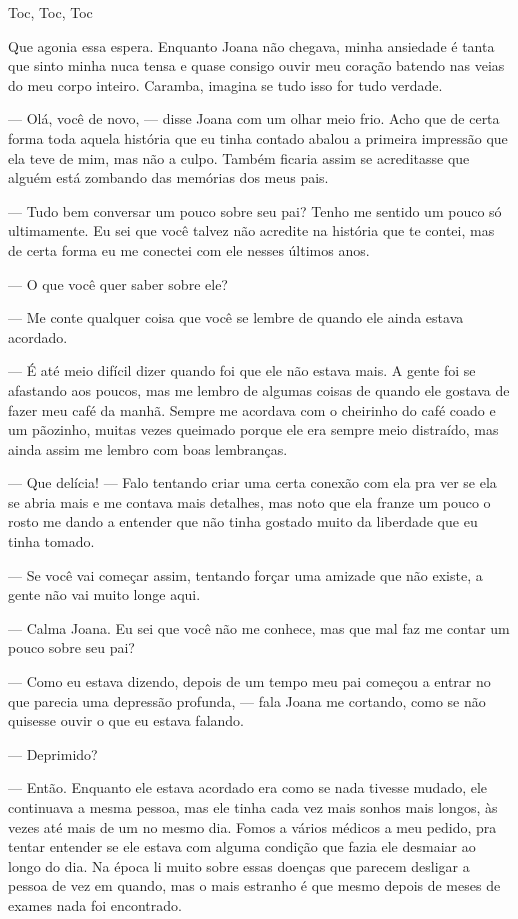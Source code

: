 Toc, Toc, Toc

Que agonia essa espera. Enquanto Joana não chegava, minha ansiedade é tanta que sinto minha nuca tensa e quase consigo ouvir meu coração batendo nas veias do meu corpo inteiro. Caramba, imagina se tudo isso for tudo verdade.

— Olá, você de novo, — disse Joana com um olhar meio frio. Acho que de certa forma toda aquela história que eu tinha contado abalou a primeira impressão que ela teve de mim, mas não a culpo. Também ficaria assim se acreditasse que alguém está zombando das memórias dos meus pais.

— Tudo bem conversar um pouco sobre seu pai? Tenho me sentido um pouco só ultimamente. Eu sei que você talvez não acredite na história que te contei, mas de certa forma eu me conectei com ele nesses últimos anos.

— O que você quer saber sobre ele?

— Me conte qualquer coisa que você se lembre de quando ele ainda estava acordado.

— É até meio difícil dizer quando foi que ele não estava mais. A gente foi se afastando aos poucos, mas me lembro de algumas coisas de quando ele gostava de fazer meu café da manhã. Sempre me acordava com o cheirinho do café coado e um pãozinho, muitas vezes queimado porque ele era sempre meio distraído, mas ainda assim me lembro com boas lembranças.

— Que delícia! — Falo tentando criar uma certa conexão com ela pra ver se ela se abria mais e me contava mais detalhes, mas noto que ela franze um pouco o rosto me dando a entender que não tinha gostado muito da liberdade que eu tinha tomado.

— Se você vai começar assim, tentando forçar uma amizade que não existe, a gente não vai muito longe aqui.

— Calma Joana. Eu sei que você não me conhece, mas que mal faz me contar um pouco sobre seu pai?

— Como eu estava dizendo, depois de um tempo meu pai começou a entrar no que parecia uma depressão profunda, — fala Joana me cortando, como se não quisesse ouvir o que eu estava falando.

— Deprimido?

— Então. Enquanto ele estava acordado era como se nada tivesse mudado, ele continuava a mesma pessoa, mas ele tinha cada vez mais sonhos mais longos, às vezes até mais de um no mesmo dia. Fomos a vários médicos a meu pedido, pra tentar entender se ele estava com alguma condição que fazia ele desmaiar ao longo do dia. Na época li muito sobre essas doenças que parecem desligar a pessoa de vez em quando, mas o mais estranho é que mesmo depois de meses de exames nada foi encontrado.

